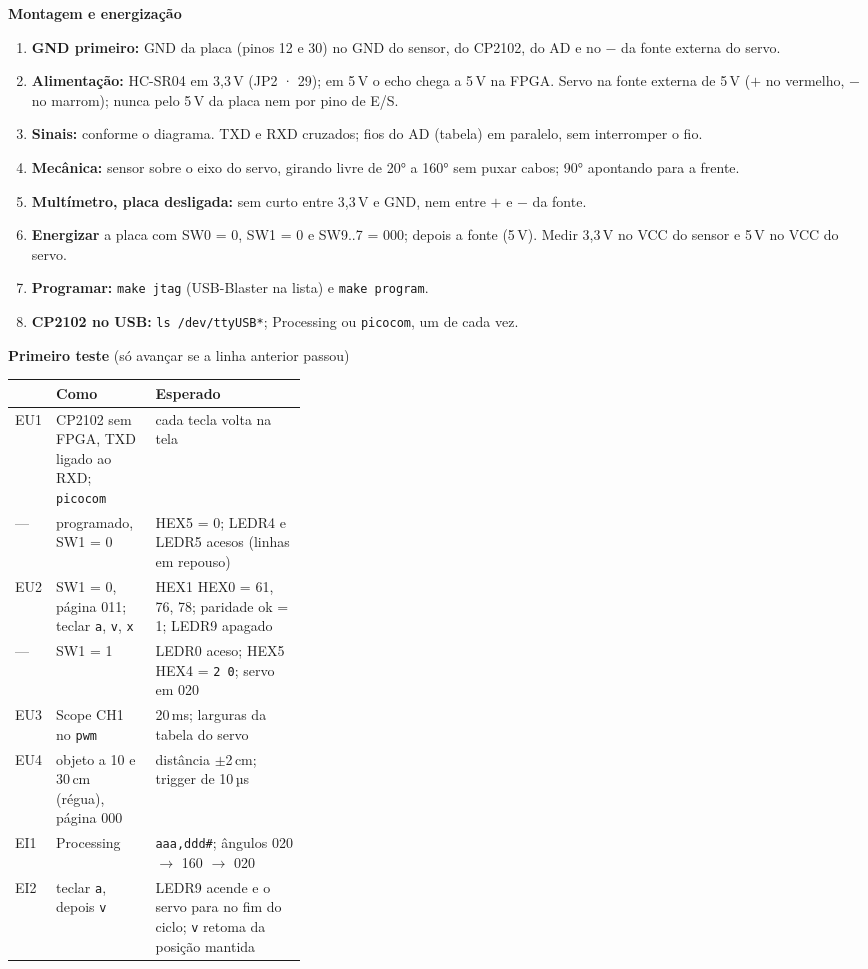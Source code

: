 \documentclass[9pt,a4paper]{extarticle}
\newcommand{\s}[1]{\texttt{#1}}          %
\begin{document}
\begin{minipage}[t]{0.49\linewidth}
\vspace{0pt}
\textbf{Montagem e energização}
\begin{enumerate}
  \item \textbf{GND primeiro:} GND da placa (pinos 12 e 30) no GND do sensor,
        do CP2102, do AD e no $-$ da fonte externa do servo.
  \item \textbf{Alimentação:} HC-SR04 em 3,3\,V (JP2 · 29); em 5\,V o echo
        chega a 5\,V na FPGA. Servo na fonte externa de 5\,V ($+$ no
        vermelho, $-$ no marrom); nunca pelo 5\,V da placa nem por pino de E/S.
  \item \textbf{Sinais:} conforme o diagrama. TXD e RXD cruzados; fios do AD (tabela)
        em paralelo, sem interromper o fio.
  \item \textbf{Mecânica:} sensor sobre o eixo do servo, girando livre de
        20° a 160° sem puxar cabos; 90° apontando para a frente.
  \item \textbf{Multímetro, placa desligada:} sem curto entre 3,3\,V e GND, nem entre $+$ e $-$ da fonte.
  \item \textbf{Energizar} a placa com SW0 = 0, SW1 = 0 e SW9..7 = 000; depois a
        fonte (5\,V). Medir 3,3\,V no VCC do sensor e 5\,V no VCC do servo.
  \item \textbf{Programar:} \s{make jtag} (USB-Blaster na lista) e
        \s{make program}.
  \item \textbf{CP2102 no USB:} \s{ls /dev/ttyUSB*}; Processing ou
        \s{picocom}, um de cada vez.
\end{enumerate}
\end{minipage}\hfill
\begin{minipage}[t]{0.49\linewidth}
\vspace{0pt}
\textbf{Primeiro teste} (só avançar se a linha anterior passou)\\[2pt]
\begin{tabularx}{\linewidth}{@{}l >{\raggedright\arraybackslash}p{0.34\linewidth} Y@{}}
\toprule
& Como & Esperado \\
\midrule
EU1 & CP2102 sem FPGA, TXD ligado ao RXD; \s{picocom} & cada tecla volta na tela \\
--- & programado, SW1 = 0 & HEX5 = 0; LEDR4 e LEDR5 acesos (linhas em repouso) \\
EU2 & SW1 = 0, página 011; teclar \s{a}, \s{v}, \s{x} & HEX1 HEX0 = 61, 76, 78; paridade ok = 1; LEDR9 apagado \\
--- & SW1 = 1 & LEDR0 aceso; HEX5 HEX4 = \s{2 0}; servo em 020 \\
EU3 & Scope CH1 no \s{pwm} & 20\,ms; larguras da tabela do servo \\
EU4 & objeto a 10 e 30\,cm (régua), página 000 & distância $\pm$2\,cm; trigger de 10\,µs \\
EI1 & Processing & \s{aaa,ddd\#}; ângulos 020 $\to$ 160 $\to$ 020 \\
EI2 & teclar \s{a}, depois \s{v} & LEDR9 acende e o servo para no fim do ciclo; \s{v} retoma da posição mantida \\
\bottomrule
\end{tabularx}
\end{minipage}
\end{document}
